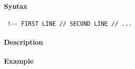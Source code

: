 


	\paragraph{Syntax}
 
 \begin{verbatim}
 !-- FIRST LINE // SECOND LINE // ...
 \end{verbatim}
 
 \paragraph{Description}
 
 \paragraph{Example}


